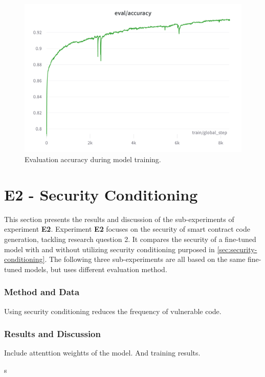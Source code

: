 \begin{figure}[htp]
    \centering
    \includegraphics[width=\textwidth]{figures/wandb-train-eval-gpt-j-smart-contract.png}
    \caption{Evaluation accuracy during model training.}
\end{figure}


\section{E2 - Security Conditioning}
\label{sec:e2-security-conditioning}
This section presents the results and discussion of the sub-experiments of experiment \textbf{E2}. Experiment \textbf{E2} focuses on the security of smart contract code generation, tackling research question 2. It compares the security of a fine-tuned model with and without utilizing security conditioning purposed in \cref{sec:security-conditioning}. The following three sub-experiments are all based on the same fine-tuned models, but uses different evaluation method.

\subsubsection{Method and Data}
Using security conditioning reduces the frequency of vulnerable code.

\subsubsection{Results and Discussion}
Include attenttion weightts of the model. And training results.

s
\label{sec:e2.1-complete-class-context}

